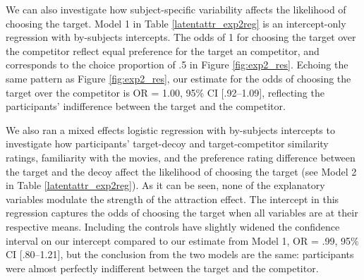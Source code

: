 \documentclass[12pt, a4paper]{article}
\begin{document}
We can also investigate how subject-specific variability affects the likelihood of choosing the target. Model 1 in Table \ref{latentattr_exp2reg} is an intercept-only regression with by-subjects intercepts. The odds of 1 for choosing the target over the competitor reflect equal preference for the target an competitor, and corresponds to the choice proportion of .5 in Figure \ref{fig:exp2_res}. Echoing the same pattern as Figure \ref{fig:exp2_res}, our estimate for the odds of choosing the target over the competitor is OR = 1.00, 95\% CI [.92--1.09], reflecting the participants' indifference between the target and the competitor. 


We also ran a mixed effects logistic regression with by-subjects intercepts to investigate how participants' target-decoy and target-competitor similarity ratings, familiarity with the movies, and the preference rating difference between the target and the decoy affect the likelihood of choosing the target (see Model 2 in Table \ref{latentattr_exp2reg}). As it can be seen, none of the explanatory variables modulate the strength of the attraction effect. The intercept in this regression captures the odds of choosing the target when all variables are at their respective means. Including the controls have slightly widened the confidence interval on our intercept compared to our estimate from Model 1, OR = .99, 95\% CI [.80--1.21], but the conclusion from the two models are the same: participants were almost perfectly indifferent between the target and the competitor. 
\end{document}
